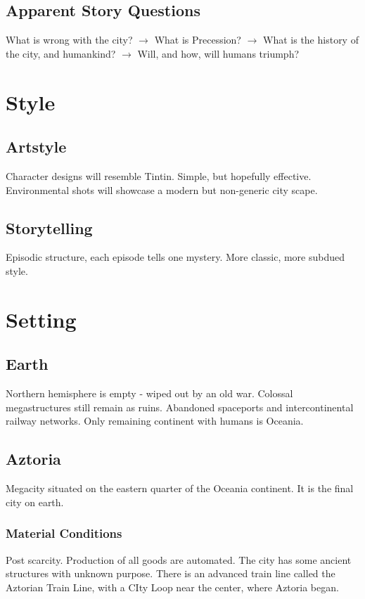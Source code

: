 \documentclass[11pt]{article}
\begin{document}
	\subsection{Apparent Story Questions}
	What is wrong with the city? $\rightarrow$ 
	What is Precession? $\rightarrow$  
	What is the history of the city, and humankind? $\rightarrow$ 
	Will, and how, will humans triumph?
\newpage






\section{Style}
	\subsection{Artstyle}
	Character designs will resemble Tintin. Simple, but hopefully effective.
	Environmental shots will showcase a modern but non-generic city scape.
	\subsection{Storytelling}
	Episodic structure, each episode tells one mystery. 
	More classic, more subdued style.
\newpage





\section{Setting}
	\subsection{Earth}
	Northern hemisphere is empty - wiped out by an old war.
	Colossal megastructures still remain as ruins.
	Abandoned spaceports and intercontinental railway networks.
	Only remaining continent with humans is Oceania.
	\subsection{Aztoria}
	Megacity situated on the eastern quarter of the Oceania continent. It is the final city on earth.
		\subsubsection{Material Conditions}
		Post scarcity. Production of all goods are automated. 
		The city has some ancient structures with unknown purpose.
		There is an advanced train line called the Aztorian Train Line, with a CIty Loop near the center, where Aztoria began. 
\end{document}
